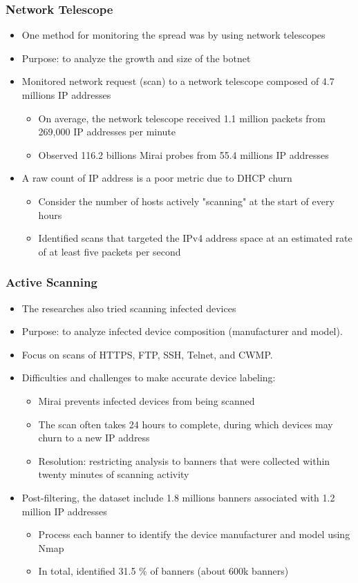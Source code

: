 \documentclass{beamer}
\begin{document}
\begin{frame}
	\frametitle{Network Telescope}
	\begin{itemize}
		\item<+-> One method for monitoring the spread was by using network telescopes
		\item<+-> Purpose: to analyze the growth and size of the botnet
		\item<+-> Monitored network request (scan) to a network telescope composed of 4.7 millions IP addresses
		\begin{itemize}
			\item<+-> On average, the network telescope received 1.1 million packets from 269,000 IP addresses per minute 
			\item<+-> Observed 116.2 billions Mirai probes from 55.4 millions IP addresses
		\end{itemize}
		\item<+-> A raw count of IP address is a poor metric due to DHCP churn
		\begin{itemize}
			\item<+-> Consider the number of hosts actively "scanning" at the start of every hours
			\item<+-> Identified scans that targeted the IPv4 address space at an estimated rate of at least five packets per second
		\end{itemize}
	\end{itemize}
\end{frame}

\begin{frame}
	\frametitle{Active Scanning}
	\begin{itemize}
		\item<+-> The researches also tried scanning infected devices
		\item<+-> Purpose: to analyze infected device composition (manufacturer and model).
		\item<+-> Focus on scans of HTTPS, FTP, SSH, Telnet, and CWMP.
		\item<+-> Difficulties and challenges to make accurate device labeling:		
		\begin{itemize}
			\item<+-> Mirai prevents infected devices from being scanned
			\item<+-> The scan often takes 24 hours to complete, during which devices may churn to a new IP address
			\item<+-> Resolution: restricting analysis to banners that were collected within twenty minutes of scanning activity
		\end{itemize}
		\item<+-> Post-filtering, the dataset include 1.8 millions banners associated with 1.2 million IP addresses
		\begin{itemize}
			\item<+-> Process each banner to identify the device manufacturer and model using Nmap
			\item<+-> In total, identified 31.5 \% of banners (about 600k banners)
		\end{itemize}
	\end{itemize}
\end{frame}
\end{document}

